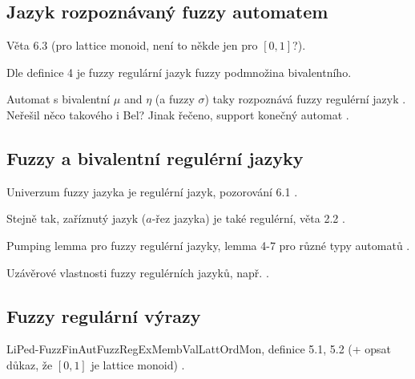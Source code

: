 \documentclass[a4paper,10pt]{article}
\begin{document}



\subsection{Jazyk rozpoznávaný fuzzy automatem}
Věta 6.3 \cite{LiPed-FuzzFinAutFuzzRegExMembValLattOrdMon} (pro lattice monoid, není to někde jen pro $[0,1]$?).

Dle definice 4 \cite{GonGar-FuzzLangInfRanAccGuzzAutPumLemDetProc} je fuzzy regulární jazyk fuzzy podmnožina bivalentního.

Automat s bivalentní $\mu$ and $\eta$ (a fuzzy $\sigma$) taky rozpoznává fuzzy regulérní jazyk \cite{PalYau-FracFuzzGramAppPatRec}. Neřešil něco takového i Bel? Jinak řečeno, support konečný automat \cite{GonGar-FuzzLangInfRanAccGuzzAutPumLemDetProc}.

\subsection{Fuzzy a bivalentní regulérní jazyky}
Univerzum fuzzy jazyka je regulérní jazyk, pozorování 6.1 \cite{LiPed-FuzzFinAutFuzzRegExMembValLattOrdMon}.

Stejně tak, zaříznutý jazyk ($a$-řez jazyka) je také regulérní, věta 2.2 \cite{PalYau-FracFuzzGramAppPatRec}. 

Pumping lemma pro fuzzy regulérní jazyky, lemma 4-7 pro různé typy automatů \cite{GonGar-FuzzLangInfRanAccGuzzAutPumLemDetProc}.

Uzávěrové vlastnosti fuzzy regulérních jazyků, např. \cite{PalYau-FracFuzzGramAppPatRec}.
\subsection{Fuzzy regulární výrazy}
LiPed-FuzzFinAutFuzzRegExMembValLattOrdMon, definice 5.1, 5.2 (+ opsat důkaz, že $[0, 1]$ je lattice monoid) \cite{LiPed-FuzzFinAutFuzzRegExMembValLattOrdMon}.
\end{document}
